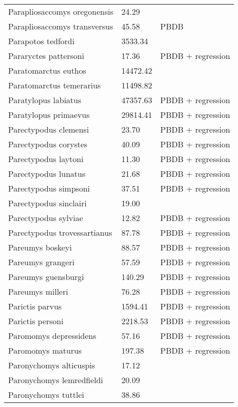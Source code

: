 \documentclass{article}
\begin{document}
\begin{center}
\begin{longtable}{p{} p{} p{}}
    Parapliosaccomys oregonensis & 24.29 & \cite{Tomiya2013} \\ 
    Parapliosaccomys transversus & 45.58 & PBDB \\ 
    Parapotos tedfordi & 3533.34 & \cite{Tomiya2013} \\ 
    Pararyctes pattersoni & 17.36 & PBDB + regression \\ 
    Paratomarctus euthos & 14472.42 & \cite{Tomiya2013} \\ 
    Paratomarctus temerarius & 11498.82 & \cite{Tomiya2013} \\ 
    Paratylopus labiatus & 47357.63 & PBDB + regression \\ 
    Paratylopus primaevus & 29814.41 & PBDB + regression \\ 
    Parectypodus clemensi & 23.70 & PBDB + regression \\ 
    Parectypodus corystes & 40.09 & PBDB + regression \\ 
    Parectypodus laytoni & 11.30 & PBDB + regression \\ 
    Parectypodus lunatus & 21.68 & PBDB + regression \\ 
    Parectypodus simpsoni & 37.51 & PBDB + regression \\ 
    Parectypodus sinclairi & 19.00 & \cite{Wilson2012} \\ 
    Parectypodus sylviae & 12.82 & PBDB + regression \\ 
    Parectypodus trovessartianus & 87.78 & PBDB + regression \\ 
    Pareumys boskeyi & 88.57 & PBDB + regression \\ 
    Pareumys grangeri & 57.59 & PBDB + regression \\ 
    Pareumys guensburgi & 140.29 & PBDB + regression \\ 
    Pareumys milleri & 76.28 & PBDB + regression \\ 
    Parictis parvus & 1594.41 & PBDB + regression \\ 
    Parictis personi & 2218.53 & PBDB + regression \\ 
    Paromomys depressidens & 57.16 & PBDB + regression \\ 
    Paromomys maturus & 197.38 & PBDB + regression \\ 
    Paronychomys alticuspis & 17.12 & \cite{Tomiya2013} \\ 
    Paronychomys lemredfieldi & 20.09 & \cite{Tomiya2013} \\ 
    Paronychomys tuttlei & 38.86 & \cite{Tomiya2013} \\ 

\end{longtable}
\end{center}
\end{document}
